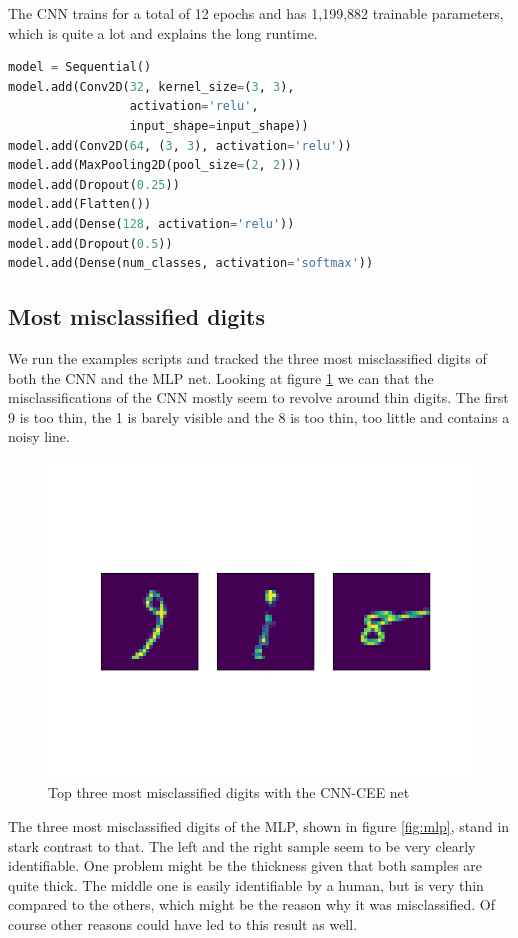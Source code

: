 \documentclass{article}[]
\begin{document}
The CNN trains for a total of 12 epochs and has 1,199,882 trainable parameters, which is quite a lot and explains the long runtime.

\begin{lstlisting}[language=Python, label=mnist-cnn, caption={mnist\_mlp.py model}, captionpos=b]
model = Sequential()
model.add(Conv2D(32, kernel_size=(3, 3),
                 activation='relu',
                 input_shape=input_shape))
model.add(Conv2D(64, (3, 3), activation='relu'))
model.add(MaxPooling2D(pool_size=(2, 2)))
model.add(Dropout(0.25))
model.add(Flatten())
model.add(Dense(128, activation='relu'))
model.add(Dropout(0.5))
model.add(Dense(num_classes, activation='softmax'))
\end{lstlisting}



\subsection{Most misclassified digits}
\label{most-misclassified-digits}
We run the examples scripts and tracked the three most misclassified digits of both the CNN and the MLP net.
Looking at figure \ref{fig:cnn} we can that the misclassifications of the CNN mostly seem to revolve around thin digits.
The first 9 is too thin, the 1 is barely visible and the 8 is too thin, too little and contains a noisy line.

\begin{figure}[H]
	\centering
	\includegraphics[width=0.5\linewidth]{img/cnn_categorial_cross_non_perm.png}
	\caption{Top three most misclassified digits with the CNN-CEE net}
	\label{fig:cnn}
\end{figure}

The three most misclassified digits of the MLP, shown in figure \ref{fig:mlp}, stand in stark contrast to that.
The left and the right sample seem to be very clearly identifiable.
One problem might be the thickness given that both samples are quite thick.
The middle one is easily identifiable by a human, but is very thin compared to the others, which might be the reason why it was misclassified.
Of course other reasons could have led to this result as well.
\end{document}
